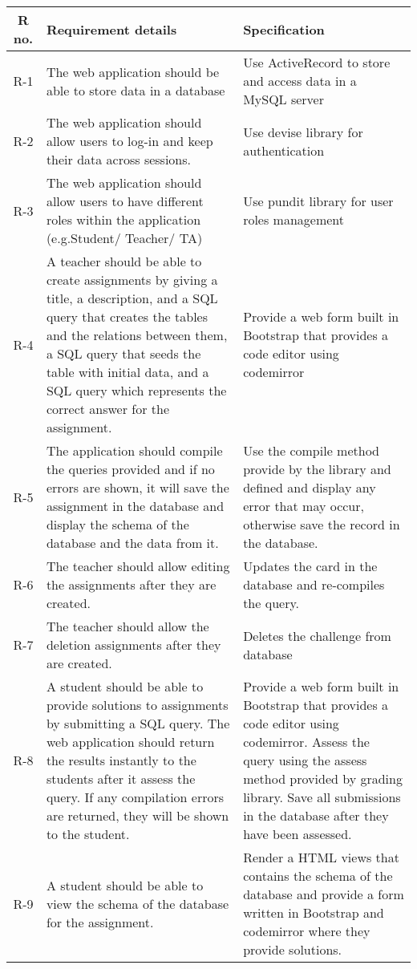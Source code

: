 \begin{tabularx}{\textwidth}{|c|Y|Y|}
  \hline
  \textbf{R no.} & \textbf{Requirement details} & \textbf{Specification} \\\hline
  \endhead
  R-1 & The web application should be able to store data in a database & Use ActiveRecord to store and access data in a MySQL server \\\hline
  R-2 & The web application should allow users to log-in and keep their data across sessions. & Use devise library for authentication \\\hline
  R-3 &  The web application should allow users to have different roles within the application (e.g.Student/ Teacher/ TA) & Use pundit library for user roles management \\\hline
  R-4 &  A teacher should be able to create assignments by giving a title, a description, and a SQL query that creates the tables and the relations between them, a SQL query that seeds the table with initial data, and a SQL query which represents the correct answer for the assignment. & Provide a web form built in Bootstrap that provides a code editor using codemirror \\\hline
  R-5 &  The application should compile the queries provided and if no errors are shown, it will save the assignment in the database and display the schema of the database and the data from it. & Use the compile method provide by the library and defined and display any error that may occur, otherwise save the record in the database. \\\hline
  R-6 & The teacher should allow editing the assignments after they are created. & Updates the card in the database and re-compiles the query. \\\hline
  R-7 & The teacher should allow the deletion assignments after they are created. & Deletes the challenge from database \\\hline
  R-8 & A student should be able to provide solutions to assignments by submitting a SQL query. The web application should return the results instantly to the students after it assess the query. If any compilation errors are returned, they will be shown to the student. & Provide a web form built in Bootstrap that provides a code editor using codemirror. Assess the query using the assess method provided by grading library. Save all submissions in the database after they have been assessed. \\\hline
  R-9 & A student should be able to view the schema of the database for the assignment. & Render a HTML views that contains the schema of the database and provide a form written in Bootstrap and codemirror where they provide solutions. \\\hline

\end{tabularx}
